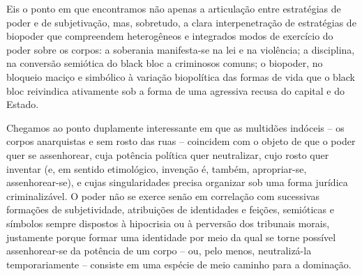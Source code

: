 Eis o ponto em que encontramos não apenas a articulação entre
estratégias de poder e de subjetivação, mas, sobretudo, a clara
interpenetração de estratégias de biopoder que compreendem heterogêneos
e integrados modos de exercício do poder sobre os corpos: a soberania
manifesta-se na lei e na violência; a disciplina, na conversão semiótica
do black bloc a criminosos comuns; o biopoder, no bloqueio maciço e
simbólico à variação biopolítica das formas de vida que o black bloc
reivindica ativamente sob a forma de uma agressiva recusa do capital e
do Estado.

Chegamos ao ponto duplamente interessante em que as multidões indóceis
-- os corpos anarquistas e sem rosto das ruas -- coincidem com o objeto
de que o poder quer se assenhorear, cuja potência política quer
neutralizar, cujo rosto quer inventar (e, em sentido etimológico,
invenção é, também, apropriar-se, assenhorear-se), e cujas
singularidades precisa organizar sob uma forma jurídica criminalizável.
O poder não se exerce senão em correlação com sucessivas formações de
subjetividade, atribuições de identidades e feições, semióticas e
símbolos sempre dispostos à hipocrisia ou à perversão dos tribunais
morais, justamente porque formar uma identidade por meio da qual se
torne possível assenhorear-se da potência de um corpo -- ou, pelo menos,
neutralizá-la temporariamente -- consiste em uma espécie de meio caminho
para a dominação.

